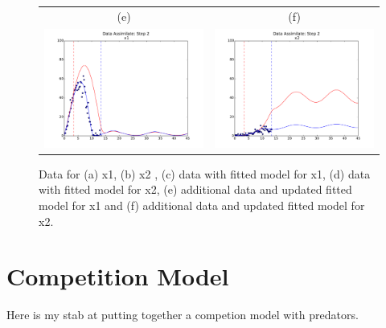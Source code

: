 \documentclass[11pt,twoside]{article}
\numberwithin{equation}{section}
\begin{document}
\begin{figure}[ht!]
\begin{center}
\begin{tabular}{c c}
    (e) & (f) \\
    \includegraphics[width=3in]{DSStep2x1.pdf} &
    \includegraphics[width=3in]{DSStep2x2.pdf} \\
      \end{tabular}
  \end{center}\caption{ Data for (a) x1, (b) x2 , (c) data with fitted model for x1, (d) data with fitted model for x2, (e) additional data and updated fitted model for x1 and (f) additional data and updated fitted model for x2.}\label{fig:Example1}
\end{figure}

\section{Competition Model}
\label{sect-competition}

Here is my stab at putting together a competion model with predators.
\end{document}
